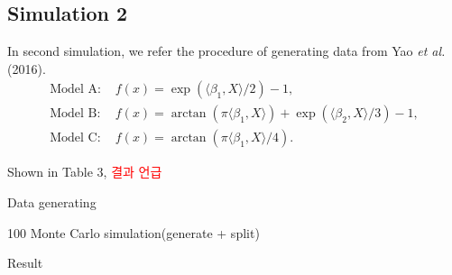 \documentclass[eng]{csam}
\begin{document}


\subsection{Simulation 2}
In second simulation, we refer the procedure of generating data from Yao {\em et al.} (2016). 
\begin{align*}
	\text{Model A: } & f(x) = \exp(\langle \beta_1, X \rangle / 2) - 1, \\
	\text{Model B: } & f(x) = \arctan(\pi \langle \beta_1, X \rangle) + \exp(\langle \beta_2, X \rangle / 3) - 1, \\
	\text{Model C: } & f(x) = \arctan(\pi \langle \beta_1, X \rangle / 4).
\end{align*}

Shown in Table 3, \textcolor{red}{결과 언급}

{\color{red}
	Data generating
	
	100 Monte Carlo simulation(generate + split)
	
	Result
}
\end{document}
